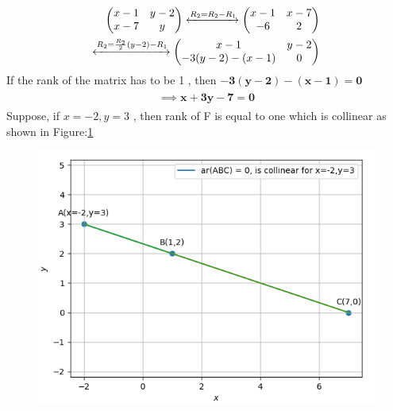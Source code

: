 \documentclass[12pt]{article}
\newcommand{\myvec}[1]{\ensuremath{\begin{pmatrix}#1\end{pmatrix}}}
\let\vec\mathbf
\begin{document}
\begin{align}
\label{eq:chem_balance_mat_row}
\myvec{
x-1 & y-2
\\
x-7 & y
}
\xleftrightarrow[]{R_2 = R_2-R_1}
\myvec{
  x-1 & x-7
  \\
	  -6 & 2                 
	  }
	  \\
	\xleftrightarrow[]{R_2 = \frac{R_2}{2}(y-2)-R_1}
\myvec{
x-1 & y-2
\\
	-3(y-2)-(x-1) & 0
}
\end{align}
If the rank of the matrix has to be 1 , then $\vec{-3(y-2)-(x-1)=0}$
\begin{align}
	\begin{split}
	\implies	\vec{x+3y-7=0}
	\end{split}
\end{align}
Suppose, if $x=-2,y=3$ , then rank of F is equal to one which is collinear as shown in Figure:\ref    {fig:Fig}
\begin{figure}[!h]
	\begin{center} 
	    \includegraphics[width=\columnwidth]{./figs/sc1.png}
	\end{center}
\caption{}
\label{fig:Fig}
\end{figure}
\end{document}
